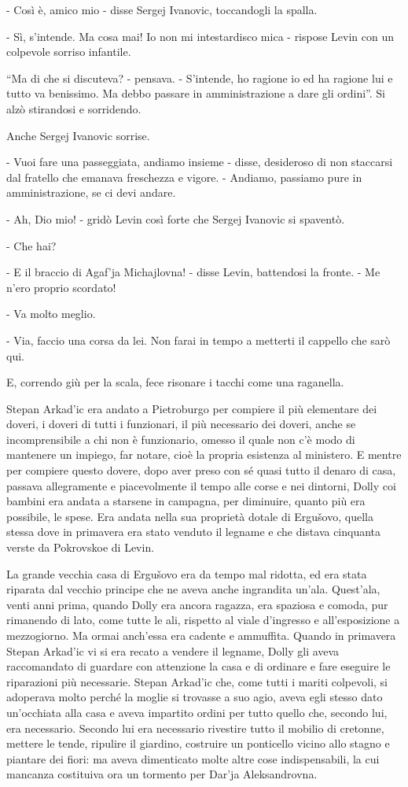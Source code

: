 - Così è, amico mio - disse Sergej Ivanovic, toccandogli la spalla. 

- Sì, s'intende. Ma cosa mai! Io non mi intestardisco mica - rispose Levin con un colpevole sorriso infantile. 

``Ma di che si discuteva? - pensava. - S'intende, ho ragione io ed ha ragione lui e tutto va benissimo. Ma debbo passare in amministrazione a dare gli ordini''. Si alzò stirandosi e sorridendo. 

Anche Sergej Ivanovic sorrise. 

- Vuoi fare una passeggiata, andiamo insieme - disse, desideroso di non staccarsi dal fratello che emanava freschezza e vigore. - Andiamo, passiamo pure in amministrazione, se ci devi andare. 

- Ah, Dio mio! - gridò Levin così forte che Sergej Ivanovic si spaventò. 

- Che hai? 

- E il braccio di Agaf'ja Michajlovna! - disse Levin, battendosi la fronte. - Me n'ero proprio scordato! 

- Va molto meglio. 

- Via, faccio una corsa da lei. Non farai in tempo a metterti il cappello che sarò qui. 

E, correndo giù per la scala, fece risonare i tacchi come una raganella. 

Stepan Arkad'ic era andato a Pietroburgo per compiere il più elementare dei doveri, i doveri di tutti i funzionari, il più necessario dei doveri, anche se incomprensibile a chi non è funzionario, omesso il quale non c'è modo di mantenere un impiego, far notare, cioè la propria esistenza al ministero. E mentre per compiere questo dovere, dopo aver preso con sé quasi tutto il denaro di casa, passava allegramente e piacevolmente il tempo alle corse e nei dintorni, Dolly coi bambini era andata a starsene in campagna, per diminuire, quanto più era possibile, le spese. Era andata nella sua proprietà dotale di Ergušovo, quella stessa dove in primavera era stato venduto il legname e che distava cinquanta verste da Pokrovskoe di Levin. 

La grande vecchia casa di Ergušovo era da tempo mal ridotta, ed era stata riparata dal vecchio principe che ne aveva anche ingrandita un'ala. Quest'ala, venti anni prima, quando Dolly era ancora ragazza, era spaziosa e comoda, pur rimanendo di lato, come tutte le ali, rispetto al viale d'ingresso e all'esposizione a mezzogiorno. Ma ormai anch'essa era cadente e ammuffita. Quando in primavera Stepan Arkad'ic vi si era recato a vendere il legname, Dolly gli aveva raccomandato di guardare con attenzione la casa e di ordinare e fare eseguire le riparazioni più necessarie. Stepan Arkad'ic che, come tutti i mariti colpevoli, si adoperava molto perché la moglie si trovasse a suo agio, aveva egli stesso dato un'occhiata alla casa e aveva impartito ordini per tutto quello che, secondo lui, era necessario. Secondo lui era necessario rivestire tutto il mobilio di cretonne, mettere le tende, ripulire il giardino, costruire un ponticello vicino allo stagno e piantare dei fiori: ma aveva dimenticato molte altre cose indispensabili, la cui mancanza costituiva ora un tormento per Dar'ja Aleksandrovna. 

